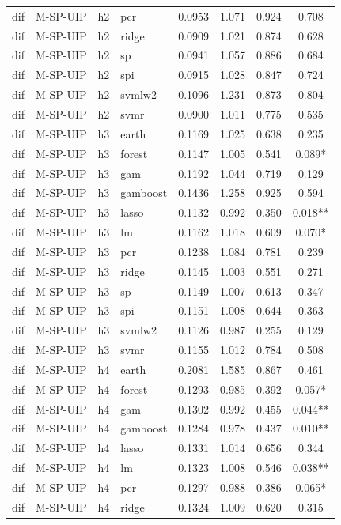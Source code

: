 \begin{ThreePartTable}
\begin{longtable}[t]{llclcccc}
dif & M-SP-UIP & h2 & pcr & 0.0953 & 1.071 & 0.924 & 0.708\\
dif & M-SP-UIP & h2 & ridge & 0.0909 & 1.021 & 0.874 & 0.628\\
dif & M-SP-UIP & h2 & sp & 0.0941 & 1.057 & 0.886 & 0.684\\
dif & M-SP-UIP & h2 & spi & 0.0915 & 1.028 & 0.847 & 0.724\\
dif & M-SP-UIP & h2 & svmlw2 & 0.1096 & 1.231 & 0.873 & 0.804\\
dif & M-SP-UIP & h2 & svmr & 0.0900 & 1.011 & 0.775 & 0.535\\
\addlinespace
dif & M-SP-UIP & h3 & earth & 0.1169 & 1.025 & 0.638 & 0.235\\
dif & M-SP-UIP & h3 & forest & 0.1147 & 1.005 & 0.541 & 0.089*\\
dif & M-SP-UIP & h3 & gam & 0.1192 & 1.044 & 0.719 & 0.129\\
dif & M-SP-UIP & h3 & gamboost & 0.1436 & 1.258 & 0.925 & 0.594\\
dif & M-SP-UIP & h3 & lasso & 0.1132 & 0.992 & 0.350 & 0.018**\\
dif & M-SP-UIP & h3 & lm & 0.1162 & 1.018 & 0.609 & 0.070*\\
dif & M-SP-UIP & h3 & pcr & 0.1238 & 1.084 & 0.781 & 0.239\\
dif & M-SP-UIP & h3 & ridge & 0.1145 & 1.003 & 0.551 & 0.271\\
dif & M-SP-UIP & h3 & sp & 0.1149 & 1.007 & 0.613 & 0.347\\
dif & M-SP-UIP & h3 & spi & 0.1151 & 1.008 & 0.644 & 0.363\\
dif & M-SP-UIP & h3 & svmlw2 & 0.1126 & 0.987 & 0.255 & 0.129\\
dif & M-SP-UIP & h3 & svmr & 0.1155 & 1.012 & 0.784 & 0.508\\
\addlinespace
dif & M-SP-UIP & h4 & earth & 0.2081 & 1.585 & 0.867 & 0.461\\
dif & M-SP-UIP & h4 & forest & 0.1293 & 0.985 & 0.392 & 0.057*\\
dif & M-SP-UIP & h4 & gam & 0.1302 & 0.992 & 0.455 & 0.044**\\
dif & M-SP-UIP & h4 & gamboost & 0.1284 & 0.978 & 0.437 & 0.010**\\
dif & M-SP-UIP & h4 & lasso & 0.1331 & 1.014 & 0.656 & 0.344\\
dif & M-SP-UIP & h4 & lm & 0.1323 & 1.008 & 0.546 & 0.038**\\
dif & M-SP-UIP & h4 & pcr & 0.1297 & 0.988 & 0.386 & 0.065*\\
dif & M-SP-UIP & h4 & ridge & 0.1324 & 1.009 & 0.620 & 0.315\\

\end{longtable}
\end{ThreePartTable}
